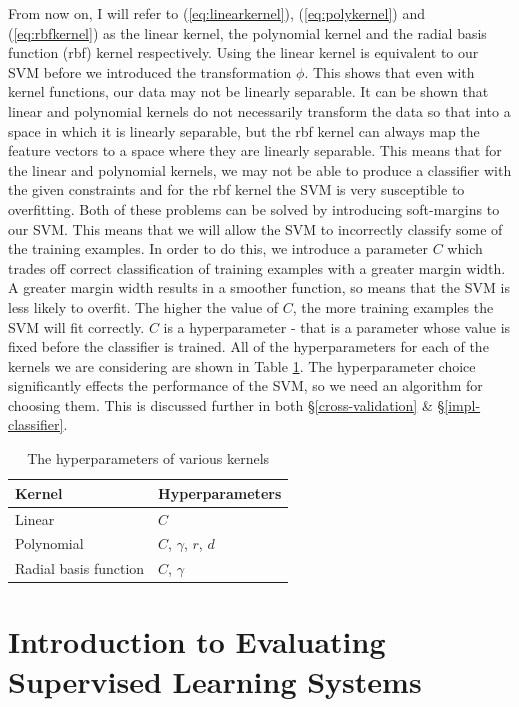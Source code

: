 \documentclass[12pt,a4paper,twoside,openright]{report}
\begin{document}
From now on, I will refer to (\ref{eq:linearkernel}), (\ref{eq:polykernel}) and (\ref{eq:rbfkernel}) as the linear kernel, the polynomial kernel and the radial basis function (rbf) kernel respectively. Using the linear kernel is equivalent to our SVM before we introduced the transformation $\phi$. This shows that even with kernel functions, our data may not be linearly separable. It can be shown that linear and polynomial kernels do not necessarily transform the data so that into a space in which it is linearly separable, but the rbf kernel can always map the feature vectors to a space where they are linearly separable. This means that for the linear and polynomial kernels, we may not be able to produce a classifier with the given constraints and for the rbf kernel the SVM is very susceptible to overfitting. Both of these problems can be solved by introducing soft-margins to our SVM. This means that we will allow the SVM to incorrectly classify some of the training examples. In order to do this, we introduce a parameter $C$ which trades off correct classification of training examples with a greater margin width. A greater margin width results in a smoother function, so means that the SVM is less likely to overfit. The higher the value of $C$, the more training examples the SVM will fit correctly. $C$ is a hyperparameter - that is a parameter whose value is fixed before the classifier is trained. All of the hyperparameters for each of the kernels we are considering are shown in Table \ref{table:hyperparameters}. The hyperparameter choice significantly effects the performance of the SVM, so we need an algorithm for choosing them. This is discussed further in both \S\ref{cross-validation} \& \S\ref{impl-classifier}.
\FloatBarrier
\begin{table}[]
	\centering
	\label{table:hyperparameters}
	\begin{tabular}{ll}
		\textbf{Kernel}       & \textbf{Hyperparameters} \\ \hline
		Linear                & $C$                      \\
		Polynomial            & $C$, $\gamma$, $r$, $d$  \\
		Radial basis function & $C$, $\gamma$             
	\end{tabular}
	\caption{The hyperparameters of various kernels}
\end{table}
\FloatBarrier
\section{Introduction to Evaluating Supervised Learning Systems} \label{prep-eval}
\end{document}
